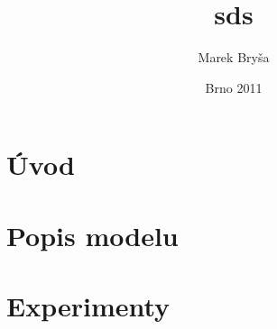 \documentclass[a4wide,12pt]{report}
\title{sds}
\author{Marek Bryša}
\date{Brno 2011}
\begin{document}
\chapter{Úvod}
\chapter{Popis modelu}
\chapter{Experimenty}
\begin{thebibliography}{9}


\end{thebibliography}
\end{document}
